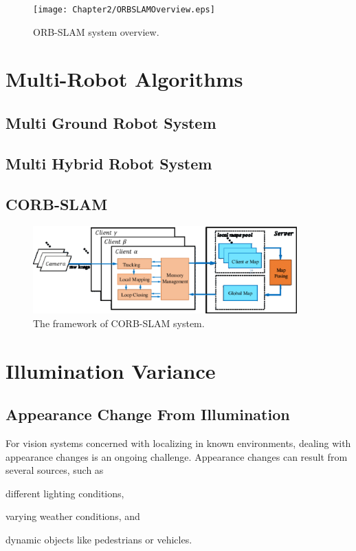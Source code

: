 \begin{figure}[H]
\centering
\texttt{[image: Chapter2/ORBSLAMOverview.eps]}
\caption{ORB-SLAM system overview.}
\label{fig:orbslamoverview} 
\end{figure}

\section{Multi-Robot Algorithms}
\subsection{Multi Ground Robot System}
\subsection{Multi Hybrid Robot System}
\subsection{CORB-SLAM}
\cite{li2017corb}
\begin{figure}[H]
\centering
\includegraphics[width=4in]{Chapter2/CORBSLAMOverview.eps}
\caption{The framework of CORB-SLAM system.}
\label{fig:corbslamoverview} 
\end{figure}

\section{Illumination Variance}

\subsection{Appearance Change From Illumination}
For vision systems concerned with localizing in known environments, dealing with appearance changes is an ongoing challenge. Appearance changes can result from several sources, such as 
\begin{inparaenum}[(i)]
	\item different lighting conditions,	
		\label{ls:appearancechange1}
	\item varying weather conditions, and
		\label{ls:appearancechange2}
	\item dynamic objects like pedestrians or vehicles.
		\label{ls:appearancechange3}
\end{inparaenum}

